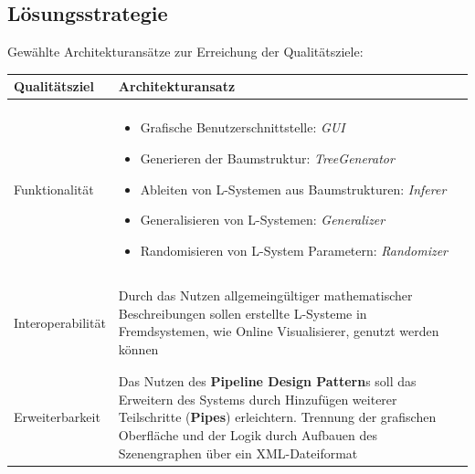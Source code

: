 \documentclass[11pt]{article}
\begin{document}
    \subsection{Lösungsstrategie}
    Gewählte Architekturansätze zur Erreichung der Qualitätsziele:
    \begin{center}
        \begin{tabular}{l|l}
            \textbf{Qualitätsziel} & \textbf{Architekturansatz} \\
            \hline \\
            Funktionalität &
            \begin{minipage}[t]{0.8\textwidth}
                \begin{itemize}
                    \item Grafische Benutzerschnittstelle: \textit{GUI}
                    \item Generieren der Baumstruktur: \textit{TreeGenerator}
                    \item Ableiten von L-Systemen aus Baumstrukturen: \textit{Inferer}
                    \item Generalisieren von L-Systemen: \textit{Generalizer}
                    \item Randomisieren von L-System Parametern: \textit{Randomizer}
                \end{itemize}
            \end{minipage} \\
            \\ \hline \\
            Interoperabilität &
            \begin{minipage}[t]{0.8\textwidth}
                Durch das Nutzen allgemeingültiger mathematischer Beschreibungen sollen erstellte
                L-Systeme in Fremdsystemen, wie Online Visualisierer, genutzt werden können
            \end{minipage} \\
            \\ \hline \\
            Erweiterbarkeit &
            \begin{minipage}[t]{0.8\textwidth}
                Das Nutzen des \textbf{Pipeline Design Pattern}s soll das Erweitern des Systems durch
                Hinzufügen weiterer Teilschritte (\textbf{Pipes}) erleichtern.
                Trennung der grafischen Oberfläche und der Logik durch Aufbauen des Szenengraphen über ein
                XML-Dateiformat
            \end{minipage} \\

\end{tabular}
\end{center}
\end{document}
